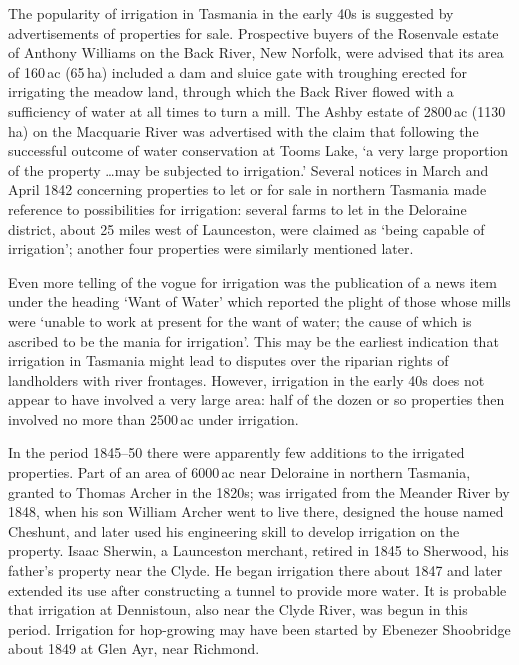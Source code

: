 The popularity of irrigation in Tasmania in the early 40s is suggested
by advertisements of properties for sale.  Prospective buyers of the
Rosenvale estate of Anthony Williams on the Back
River, New Norfolk, were advised that its area of
160\,ac (65\,ha) included a dam and sluice gate with troughing erected
for irrigating the meadow land, through which the Back River flowed
with a sufficiency of water at all times to turn a mill.  The Ashby
estate of 2800\,ac (1130\,ha) on the Macquarie
River was advertised with the claim that
following the successful outcome of water conservation at Tooms
Lake, `a very large proportion of the property
\ldots may be subjected to irrigation.'  Several notices in March and
April 1842 concerning properties to let or for sale in northern
Tasmania made reference to possibilities for irrigation: several farms
to let in the Deloraine district, about 25 miles west
of Launceston, were claimed as `being capable of irrigation'; another
four properties were similarly mentioned later.

Even more telling of the vogue for irrigation was the publication of a
news item under the heading `Want of Water' which reported the plight
of those whose mills were `unable to work at present for the want of
water; the cause of which is ascribed to be the mania for
irrigation'.  This may
be the earliest indication that irrigation in Tasmania might lead to
disputes over the riparian rights of landholders with river frontages.
However, irrigation in the early 40s does not appear to have involved
a very large area: half of the dozen or so properties then involved no
more than 2500\,ac under irrigation.

In the period 1845--50 there were apparently few additions to the
irrigated properties.  Part of an area of 6000\,ac near Deloraine in
northern Tasmania, granted to Thomas Archer in the
1820s; was irrigated from the Meander River by
1848, when his son William Archer went to live
there, designed the house named Ches\-hunt, and later used his
engineering skill to develop irrigation on the property.  Isaac
Sherwin, a Launceston merchant, retired in 1845 to
Sherwood, his father's property near the Clyde.  He began irrigation
there about 1847 and later extended its use after constructing a
tunnel to provide more water.  It is probable that irrigation at
Dennistoun, also near the Clyde River, was begun in
this period.  Irrigation for hop-growing may have been
started by Ebenezer Shoobridge about 1849 at
Glen Ayr, near Richmond.

